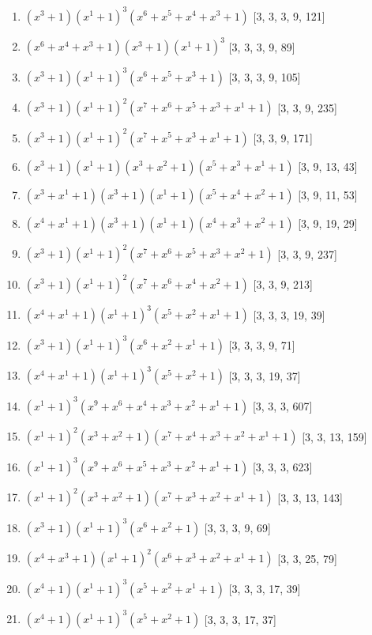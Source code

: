\documentclass[10pt,twocolumn]{article}
\begin{document}
\begin{enumerate}
\item $(x^{3} + 1)(x^{1} + 1)^{3}(x^{6} + x^{5} + x^{4} + x^{3} + 1)$  [3, 3, 3, 9, 121]
\item $(x^{6} + x^{4} + x^{3} + 1)(x^{3} + 1)(x^{1} + 1)^{3}$  [3, 3, 3, 9, 89]
\item $(x^{3} + 1)(x^{1} + 1)^{3}(x^{6} + x^{5} + x^{3} + 1)$  [3, 3, 3, 9, 105]
\item $(x^{3} + 1)(x^{1} + 1)^{2}(x^{7} + x^{6} + x^{5} + x^{3} + x^{1} + 1)$  [3, 3, 9, 235]
\item $(x^{3} + 1)(x^{1} + 1)^{2}(x^{7} + x^{5} + x^{3} + x^{1} + 1)$  [3, 3, 9, 171]
\item $(x^{3} + 1)(x^{1} + 1)(x^{3} + x^{2} + 1)(x^{5} + x^{3} + x^{1} + 1)$  [3, 9, 13, 43]
\item $(x^{3} + x^{1} + 1)(x^{3} + 1)(x^{1} + 1)(x^{5} + x^{4} + x^{2} + 1)$  [3, 9, 11, 53]
\item $(x^{4} + x^{1} + 1)(x^{3} + 1)(x^{1} + 1)(x^{4} + x^{3} + x^{2} + 1)$  [3, 9, 19, 29]
\item $(x^{3} + 1)(x^{1} + 1)^{2}(x^{7} + x^{6} + x^{5} + x^{3} + x^{2} + 1)$  [3, 3, 9, 237]
\item $(x^{3} + 1)(x^{1} + 1)^{2}(x^{7} + x^{6} + x^{4} + x^{2} + 1)$  [3, 3, 9, 213]
\item $(x^{4} + x^{1} + 1)(x^{1} + 1)^{3}(x^{5} + x^{2} + x^{1} + 1)$  [3, 3, 3, 19, 39]
\item $(x^{3} + 1)(x^{1} + 1)^{3}(x^{6} + x^{2} + x^{1} + 1)$  [3, 3, 3, 9, 71]
\item $(x^{4} + x^{1} + 1)(x^{1} + 1)^{3}(x^{5} + x^{2} + 1)$  [3, 3, 3, 19, 37]
\item $(x^{1} + 1)^{3}(x^{9} + x^{6} + x^{4} + x^{3} + x^{2} + x^{1} + 1)$  [3, 3, 3, 607]
\item $(x^{1} + 1)^{2}(x^{3} + x^{2} + 1)(x^{7} + x^{4} + x^{3} + x^{2} + x^{1} + 1)$  [3, 3, 13, 159]
\item $(x^{1} + 1)^{3}(x^{9} + x^{6} + x^{5} + x^{3} + x^{2} + x^{1} + 1)$  [3, 3, 3, 623]
\item $(x^{1} + 1)^{2}(x^{3} + x^{2} + 1)(x^{7} + x^{3} + x^{2} + x^{1} + 1)$  [3, 3, 13, 143]
\item $(x^{3} + 1)(x^{1} + 1)^{3}(x^{6} + x^{2} + 1)$  [3, 3, 3, 9, 69]
\item $(x^{4} + x^{3} + 1)(x^{1} + 1)^{2}(x^{6} + x^{3} + x^{2} + x^{1} + 1)$  [3, 3, 25, 79]
\item $(x^{4} + 1)(x^{1} + 1)^{3}(x^{5} + x^{2} + x^{1} + 1)$  [3, 3, 3, 17, 39]
\item $(x^{4} + 1)(x^{1} + 1)^{3}(x^{5} + x^{2} + 1)$  [3, 3, 3, 17, 37]

\end{enumerate}
\end{document}
